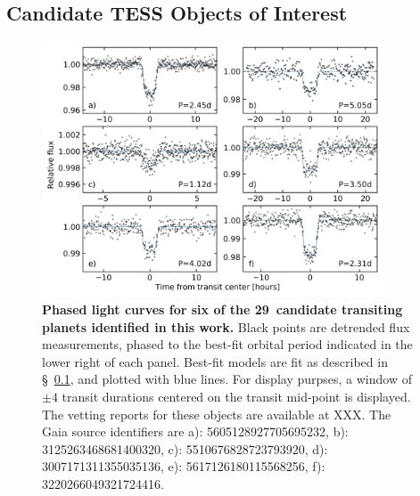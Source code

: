 \documentclass[12pt,twocolumn,tighten]{aastex62}
\newcommand{\numberpcs}{29\ }  %
\begin{document}
\subsection{Candidate TESS Objects of Interest}
\label{subsec:ctois}

\begin{figure}[!t]
	\begin{center}
		\leavevmode
		\includegraphics[width=0.9\textwidth]{quilt_PCs.png}
	\end{center}
	\vspace{-0.2cm}
	\caption{
		{\bf Phased light curves for six of the \numberpcs candidate
			transiting planets identified in this work.}
		Black points are detrended flux measurements, phased to the
		best-fit orbital period indicated in the lower right of each
		panel.
		Best-fit models are fit as described in \S~\ref{subsec:ctois}, and
		plotted with blue lines.
		For display purpses, a window of $\pm 4$ transit durations
		centered on the transit mid-point is displayed.
		The vetting reports for these objects are available at XXX.	%
		The Gaia source identifiers are
		a): 5605128927705695232, 
		b): 3125263468681400320, 
		c): 5510676828723793920, 
		d): 3007171311355035136, 
		e): 5617126180115568256, 
		f): 3220266049321724416.   
		\label{fig:ctoi_quilt}
	}
\end{figure}
\end{document}
